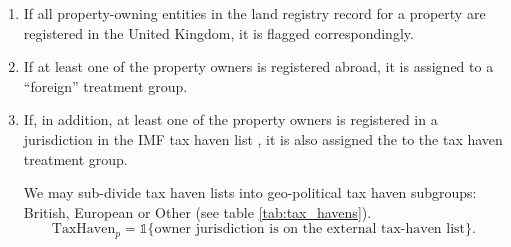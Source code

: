 \documentclass[12pt]{article}
\begin{document}
\begin{enumerate}
\item If all property-owning entities in the land registry record for a property are registered in the United Kingdom, it is flagged correspondingly. 
\item If at least one of the property owners is registered abroad, it is assigned to a ``foreign'' treatment group. 
\item If, in addition, at least one of the property owners is registered in a jurisdiction in the IMF tax haven list \autocite[Table 2]{imf2000offshore}, it is also assigned the to the tax haven treatment group. 
    
\iffalse 

We may sub-divide tax haven lists into geo-political tax haven subgroups: British, European or Other (see table \ref{tab:tax_havens}).
    \[
    \text{TaxHaven}_p = \mathbb{1}\{\text{owner jurisdiction is on the external tax-haven list}\}.
    \]
 

\end{enumerate}
\end{document}

